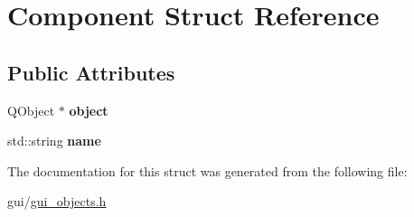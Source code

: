 \hypertarget{struct_component}{}\section{Component Struct Reference}
\label{struct_component}
\subsection*{Public Attributes}
\begin{DoxyCompactItemize}
\item 
\mbox{\label{struct_component_aa0cd0fd532b68947f1d6f6f50ca76700}} 
Q\+Object $\ast$ {\bfseries object}
\item 
\mbox{\label{struct_component_a46343549452bda5ee9752f7a9bc15efb}} 
std\+::string {\bfseries name}
\end{DoxyCompactItemize}


The documentation for this struct was generated from the following file\+:\begin{DoxyCompactItemize}
\item 
gui/\hyperlink{gui__objects_8h}{gui\+\_\+objects.\+h}\end{DoxyCompactItemize}
